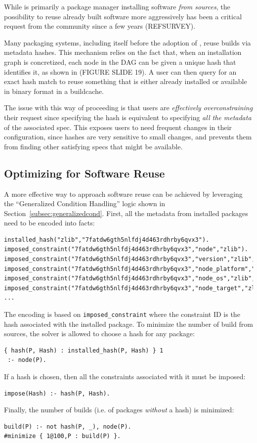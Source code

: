 While \spack{} is primarily a package manager installing software \emph{from sources}, the possibility to reuse  already built software more aggressively has been a critical request from the community since a few years (REFSURVEY).

Many packaging systems, including \spack{} itself before the adoption of \clingo, reuse builds via metadata hashes. This mechanism relies on the fact that, when an installation graph is concretized, each node in the DAG can be given a unique hash that identifies it, as shown in (FIGURE SLIDE 19). A user can then query for an exact hash match to reuse something that is either already installed or available in binary format in a buildcache. 

The issue with this way of proceeding is that users are \emph{effectively overconstraining} their request since specifying the hash is equivalent to specifying \emph{all the metadata} of the associated spec. This exposes users to need frequent changes in their configuration, since hashes are very sensitive to small changes, and prevents them from finding other satisfying specs that might be available.

\subsection{Optimizing for Software Reuse}
A more effective way to approach software reuse can be achieved by leveraging the ``Generalized Condition Handling'' logic shown in Section~\ref{subsec:generalizedcond}. 
First, all the metadata from installed packages need to be encoded into facts:
\begin{verbatim}
installed_hash("zlib","7fatdw6gth5nlfdj4d463rdhrby6qvx3").
imposed_constraint("7fatdw6gth5nlfdj4d463rdhrby6qvx3","node","zlib").
imposed_constraint("7fatdw6gth5nlfdj4d463rdhrby6qvx3","version","zlib","1.2.11").
imposed_constraint("7fatdw6gth5nlfdj4d463rdhrby6qvx3","node_platform","zlib","linux").
imposed_constraint("7fatdw6gth5nlfdj4d463rdhrby6qvx3","node_os","zlib","ubuntu20.04").
imposed_constraint("7fatdw6gth5nlfdj4d463rdhrby6qvx3","node_target","zlib","icelake").
...
\end{verbatim}
The encoding is based on \texttt{imposed\_constraint} where the constraint ID is the hash associated with the installed package.
To minimize the number of build from sources, the solver is allowed to choose a hash for any package:
\begin{verbatim}
{ hash(P, Hash) : installed_hash(P, Hash) } 1
 :- node(P).
\end{verbatim}
If a hash is chosen, then all the constraints associated with it must be imposed:
\begin{verbatim}
impose(Hash) :- hash(P, Hash).
\end{verbatim}
Finally, the number of builds (i.e. of packages \emph{without} a hash) is minimized:
\begin{verbatim}
build(P) :- not hash(P, _), node(P).
#minimize { 1@100,P : build(P) }.
\end{verbatim}

